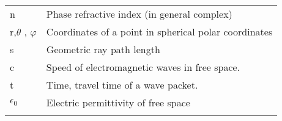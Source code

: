 \documentclass[11pt]{article} %
\begin{document}
\begin{table}[]
\begin{tabular}{ll}
n                                                & Phase refractive index (in general complex)                                                                                                                                                                                                \\
r,$\theta$ , $\varphi$                           & Coordinates of a point in spherical polar coordinates                                                                                                                                                                                       \\
s                                                & Geometric ray path length                                                                                                                                                                                                                  \\
c                                                & Speed of electromagnetic waves in free space.                                                                                                                                                                                              \\
t                                                & Time, travel time of a wave packet.                                                                                                                                                                                                        \\
$\epsilon_0$                                    & Electric permittivity of free space                                                                                                                                                                                                        \\
                                                 &                                                                                                                                                                                                                                           
\end{tabular}
\end{table}
\end{document}
